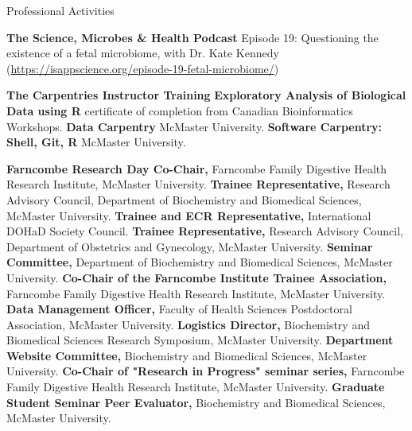 \begin{rubric}{Professional Activities}
%

%
\entry*[2023]%
    \textbf{The Science, Microbes \& Health Podcast} Episode 19: Questioning the existence of a fetal microbiome, with Dr. Kate Kennedy (\url{https://isappscience.org/episode-19-fetal-microbiome/})
%

%
\entry*[2022]%
    \textbf{The Carpentries Instructor Training}
%  
\entry*[2019]%
    \textbf{Exploratory Analysis of Biological Data using R} certificate of completion from Canadian Bioinformatics Workshops.
%  
\entry*[2017]%
    \textbf{Data Carpentry} McMaster University.
%
\entry*[2017]%
    \textbf{Software Carpentry: Shell, Git, R} McMaster University.
%

\entry*[2023, 2024]%
    \textbf{Farncombe Research Day Co-Chair,} Farncombe Family Digestive Health Research Institute, McMaster University.
%
\entry*[2023 -- 2025]%
    \textbf{Trainee Representative,} Research Advisory Council, Department of Biochemistry and Biomedical Sciences, McMaster University.
%
\entry*[2022 -- 2026]%
    \textbf{Trainee and ECR Representative,} International DOHaD Society Council.
%
\entry*[2022 -- present]%
    \textbf{Trainee Representative,} Research Advisory Council, Department of Obstetrics and Gynecology, McMaster University.
%
\entry*[2022 -- 2025]%
    \textbf{Seminar Committee,} Department of Biochemistry and Biomedical Sciences, McMaster University.
%
\entry*[2019 -- present]%
    \textbf{Co-Chair of the Farncombe Institute Trainee Association,} Farncombe Family Digestive Health Research Institute, McMaster University.
%    
\entry*[2022 -- 2023]%
    \textbf{Data Management Officer,} Faculty of Health Sciences Postdoctoral Association, McMaster University.
%
%
\entry*[2019 -- 2020]%
    \textbf{Logistics Director,} Biochemistry and Biomedical Sciences Research Symposium, McMaster University.
%
\entry*[2018 -- 2019]%
	\textbf{Department Website Committee,} Biochemistry and Biomedical Sciences, McMaster University. 
%
\entry*[2016 -- 2019]%
	\textbf{Co-Chair of "Research in Progress" seminar series,} Farncombe Family Digestive Health Research Institute, McMaster University. 
%
\entry*[2017 -- 2018]%
	\textbf{Graduate Student Seminar Peer Evaluator,} Biochemistry and Biomedical Sciences, McMaster University.	
%
%
%


\end{rubric}
